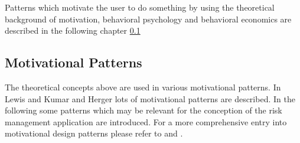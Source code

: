 Patterns which motivate the user to do something by using the theoretical background of motivation, behavioral psychology and behavioral economics are described in the following chapter \ref{sec:theoryBc}



\subsection{Motivational Patterns}
\label{sec:theoryBc}

The theoretical concepts above are used in various motivational patterns. In Lewis \cite{lewisIrresistibleAppsMotivational2014} and Kumar and Herger \cite{inproceedings} lots of motivational patterns are described. In the following some patterns which may be relevant for the conception of the risk management application are introduced. For a more comprehensive entry into motivational design patterns please refer to \cite{lewisIrresistibleAppsMotivational2014} and \cite{inproceedings}.

